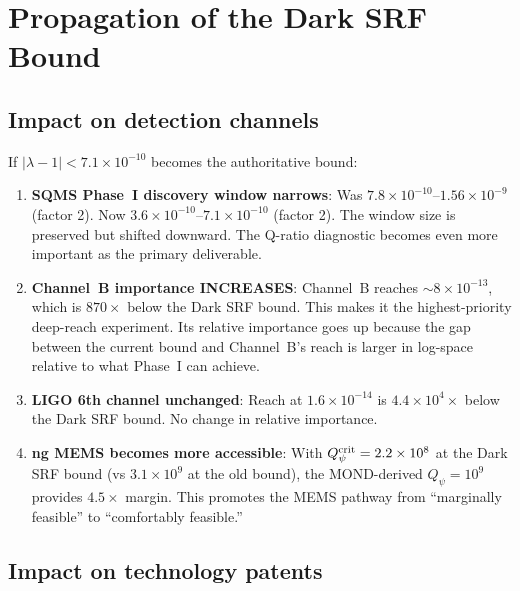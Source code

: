 \documentclass[11pt]{article}
\newcommand{\lbone}{|\lambda - 1|}
\newcommand{\Qpsi}{Q_\psi}
\newcommand{\ee}[1]{\times 10^{#1}}
\theoremstyle{definition}
\theoremstyle{remark}
\begin{document}
\section{Propagation of the Dark SRF Bound}
\label{sec:propagation}

\subsection{Impact on detection channels}

If $\lbone < 7.1\ee{-10}$ becomes the authoritative bound:

\begin{enumerate}
\item \textbf{SQMS Phase~I discovery window narrows}:
  Was $7.8\ee{-10}$--$1.56\ee{-9}$ (factor 2). Now
  $3.6\ee{-10}$--$7.1\ee{-10}$ (factor 2). The window size
  is preserved but shifted downward. The Q-ratio diagnostic
  becomes even more important as the primary deliverable.

\item \textbf{Channel~B importance INCREASES}:
  Channel~B reaches $\sim 8\ee{-13}$, which is $870\times$ below
  the Dark SRF bound. This makes it the highest-priority
  deep-reach experiment. Its relative importance goes up because
  the gap between the current bound and Channel~B's reach is larger
  in log-space relative to what Phase~I can achieve.

\item \textbf{LIGO 6th channel unchanged}: Reach at $1.6\ee{-14}$
  is $4.4\ee{4}\times$ below the Dark SRF bound. No change in
  relative importance.

\item \textbf{ng MEMS becomes more accessible}: With $\Qpsi^{\rm crit}
  = 2.2\ee{8}$ at the Dark SRF bound (vs $3.1\ee{9}$ at the old
  bound), the MOND-derived $\Qpsi = 10^9$ provides $4.5\times$
  margin. This promotes the MEMS pathway from ``marginally feasible''
  to ``comfortably feasible.''
\end{enumerate}

\subsection{Impact on technology patents}
\end{document}
